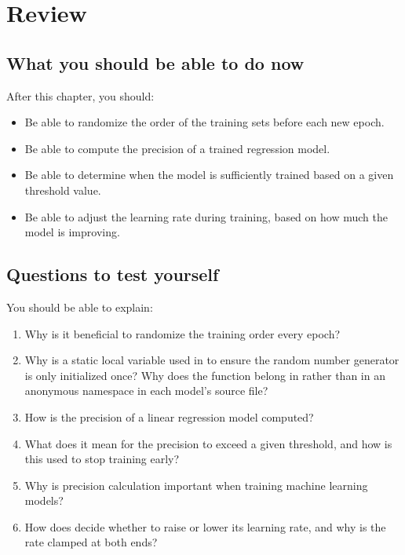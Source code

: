 
\section{Review}
\label{c2:sec:review}

\subsection*{What you should be able to do now}
After this chapter, you should:
\begin{itemize}
  \item Be able to randomize the order of the training sets before each new epoch.
  \item Be able to compute the precision of a trained regression model.
  \item Be able to determine when the model is sufficiently trained based on a given threshold
    value.
  \item Be able to adjust the learning rate during training, based on how much the model is
    improving.
\end{itemize}

\subsection*{Questions to test yourself}
You should be able to explain:
\begin{enumerate}
  \item Why is it beneficial to randomize the training order every epoch?
  \item Why is a static local variable used in  to ensure the random number
    generator is only initialized once? Why does the function belong in  rather
    than in an anonymous namespace in each model's source file?
  \item How is the precision of a linear regression model computed?
  \item What does it mean for the precision to exceed a given threshold, and how is this used to
    stop training early?
  \item Why is precision calculation important when training machine learning models?
  \item How does  decide whether to raise or lower its learning rate,
    and why is the rate clamped at both ends?
\end{enumerate}

